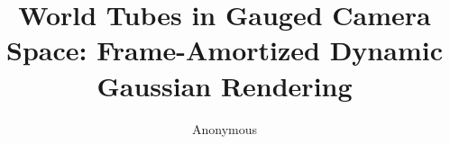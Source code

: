 \documentclass{article}
\title{World Tubes in Gauged Camera Space: Frame-Amortized Dynamic Gaussian Rendering}
\author{Anonymous}
\begin{document}
\PackageError{world-tubes-venue}{Venue source is still a blocked scaffold}{
  Port the concise Markdown only after every required evidence component is
  publication eligible. Do not input warning fragments or partial rows.
}
\maketitle

\begin{table}[t]
  \centering
  \caption{Certified bounded correctness components.}
  
\end{table}

\begin{table}[t]
  \centering
  \caption{Clean-source bounded variable-camera closure/death curve.}
  
\end{table}


\label{world-tubes-main-end}


\end{document}
